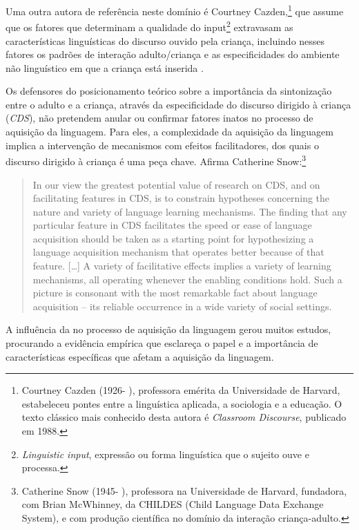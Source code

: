 \documentclass[output=paper]{LSP/langsci}
\begin{document}
Uma outra autora de referência neste domínio é Courtney Cazden,\footnote{Courtney Cazden (1926- ), professora emérita da Universidade de Harvard, estabeleceu pontes entre a linguística aplicada, a sociologia e a educação. O texto clássico mais conhecido desta autora é \emph{Classroom Discourse}, publicado em 1988.} que assume que os fatores que determinam a qualidade do input\footnote{\emph{Linguistic input}, expressão ou forma linguística que o sujeito ouve e processa.\label{ftn:simsim_input}} extravasam as características linguísticas do discurso ouvido pela criança, incluindo nesses fatores os padrões de interação adulto/criança e as especificidades do ambiente não linguístico em que a criança está inserida \citep{cazden1971}.

Os defensores do posicionamento teórico sobre a importância da sintonização entre o adulto e a criança, através da especificidade do discurso dirigido à criança (\emph{CDS}), não pretendem anular ou confirmar fatores inatos no processo de aquisição da linguagem. Para eles, a complexidade da aquisição da linguagem implica a intervenção de mecanismos com efeitos facilitadores, dos quais o discurso dirigido à criança é uma peça chave. Afirma Catherine Snow:\footnote{Catherine Snow (1945- ), professora na Universidade de Harvard, fundadora, com Brian McWhinney, da CHILDES (Child Language Data Exchange System), e com produção científica no domínio da interação criança-adulto.}

\begin{quote}
In our view the greatest potential value of research on CDS, and on facilitating features in CDS, is to constrain hypotheses concerning the nature and  variety of language learning mechanisms. The finding that any particular feature in CDS facilitates the speed or ease of language acquisition should be taken as a starting point for hypothesizing a language acquisition mechanism that operates better because of that feature. [\ldots] A variety of facilitative effects implies a variety of learning mechanisms, all operating whenever the enabling conditions hold. Such a picture is consonant with the most remarkable fact about language acquisition – its reliable occurrence in a wide variety of social settings. \citep[88--89]{snow1985}
\end{quote}

A influência da  no processo de aquisição da linguagem gerou muitos estudos, procurando a evidência empírica que esclareça o papel e a importância de características específicas que afetam a aquisição da linguagem. 
\end{document}
